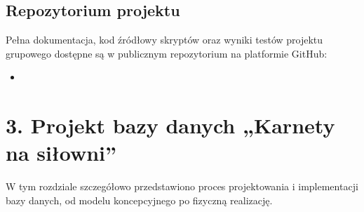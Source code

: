 \documentclass[letterpaper,10pt,polish]{sphinxmanual}
\begin{document}
\section{Repozytorium projektu}
\label{\detokenize{rozdzial2/rozdzial2:repozytorium-projektu}}
\sphinxAtStartPar
Pełna dokumentacja, kod źródłowy skryptów oraz wyniki testów projektu grupowego dostępne są w publicznym repozytorium na platformie GitHub:
\begin{itemize}
\item {} 
\sphinxAtStartPar
{}

\end{itemize}

\sphinxstepscope


\chapter{3. Projekt bazy danych „Karnety na siłowni”}
\label{\detokenize{rozdzial3/rozdzial3:projekt-bazy-danych-karnety-na-silowni}}\label{\detokenize{rozdzial3/rozdzial3::doc}}
\sphinxAtStartPar
W tym rozdziale szczegółowo przedstawiono proces projektowania i implementacji bazy danych, od modelu koncepcyjnego po fizyczną realizację.
\end{document}
